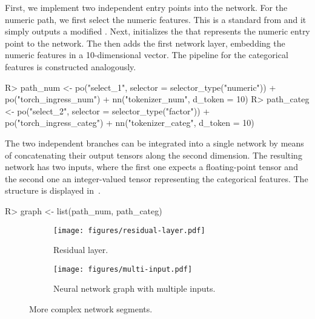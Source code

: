 \documentclass[article]{jss}
\theoremstyle{definition}
\begin{document}
First, we implement two independent entry points into the network.
For the numeric path, we first select the numeric features.
This is a standard  from  and it simply outputs a modified .
Next,  initializes the  that represents the numeric entry point to the network.
The  \citep{gorishniy2021revisiting} then adds the first network layer, embedding the numeric features in a 10-dimensional vector.
The pipeline for the categorical features is constructed analogously.

\begin{CodeInput}
R> path_num <- po("select_1", selector = selector_type("numeric")) %
+    po("torch_ingress_num") %
+    nn("tokenizer_num", d_token = 10)
R> path_categ <- po("select_2", selector = selector_type("factor")) %
+    po("torch_ingress_categ") %
+    nn("tokenizer_categ", d_token = 10)
\end{CodeInput}

The two independent branches can be integrated into a single network by means of concatenating their output tensors along the second dimension.
The resulting network has two inputs, where the first one expects a floating-point tensor and the second one an integer-valued tensor representing the categorical features.
The structure is displayed in~.

\begin{CodeInput}
R> graph <- list(path_num, path_categ) %
\end{CodeInput}

\begin{figure}[h]
    \centering
    \begin{subfigure}{0.38\textwidth}
        \centering
        \texttt{[image: figures/residual-layer.pdf]}
        \caption{Residual layer.}
        \label{fig:residual-layer}
    \end{subfigure}
    \hfill
    \begin{subfigure}{0.58\textwidth}
        \centering
        \texttt{[image: figures/multi-input.pdf]}
        \caption{Neural network graph with multiple inputs.}
        \label{fig:multi-inputs}
    \end{subfigure}
    \caption{More complex network segments.}
    \label{fig:side-by-side}
\end{figure}
\end{document}
